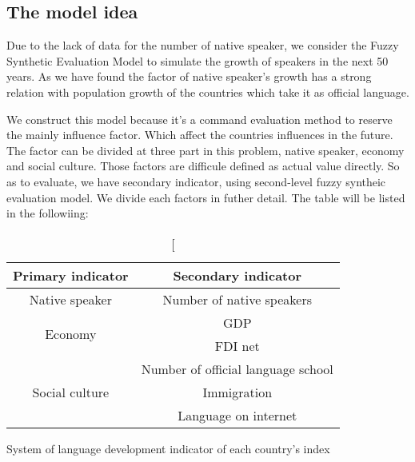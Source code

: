 \documentclass{mcmthesis}
\begin{document}
\subsection{The model idea}
\qquad Due to the lack of data for the number of native speaker, we consider the Fuzzy Synthetic Evaluation Model to simulate the growth of speakers in the next 50 years.
As we have found the factor of native speaker's growth has a strong relation with population growth of the countries which take it as official language.

We construct this model because it's a command evaluation method to reserve the mainly influence factor. Which affect the countries influences in the future. The factor can be divided at three part in this problem,
native speaker, economy and social culture. Those factors are difficule defined as actual value directly. So as to evaluate, we have secondary indicator, 
using second-level fuzzy syntheic evaluation model. We divide each factors in futher detail. The table will be listed in the followiing:
\begin{table}[h]
\begin{center}
{\hspace{-1in}

\fontsize{10}{12}\selectfont
\begin{tabular}{c c}
\toprule
\textbf{Primary indicator}     & \textbf{Secondary indicator}    \\
\midrule

Native speaker & Number of native speakers  \\

\hline

\multirow{2}{*}{Economy}    & GDP \\
 &FDI net \\

\hline

\multirow{3}{*}{Social culture} &  Number of official language school \\
 &Immigration \\
 &Language on internet \\

\bottomrule
\end{tabular}

\caption[System of language development indicator of each country's index}
\end{center}
\end{table}
\end{document}
